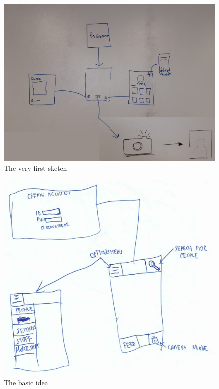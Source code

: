 \documentclass[12pt]{scrartcl}
\begin{document}
	\begin{figure}[H]
        		\centering
       		\includegraphics[width=\textwidth]{../images/design1.jpg}
       		\caption{The very first sketch}
        		\label{sketch1}
	\end{figure}
	
	\begin{figure}[H]
        		\centering
       		\includegraphics[width=\textwidth]{../images/design2.jpg}
       		\caption{The basic idea}
        		\label{sketch2}
	\end{figure}
	
\end{document}
